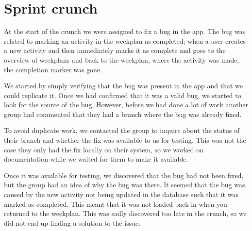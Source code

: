 \section{Sprint crunch}
At the start of the crunch we were assigned to fix a bug in the app.
The bug was related to marking an activity in the weekplan as completed; when a user creates a new activity and then immediately marks it as complete and goes to the overview of weekplans and back to the weekplan, where the activity was made, the completion marker was gone.

We started by simply verifying that the bug was present in the app and that we could replicate it.
Once we had confirmed that it was a valid bug, we started to look for the source of the bug.
However, before we had done a lot of work another group had commented that they had a branch where the bug was already fixed.

To avoid duplicate work, we contacted the group to inquire about the status of their branch and whether the fix was available to us for testing.
This was not the case they only had the fix locally on their system, so we worked on documentation while we waited for them to make it available.

Once it was available for testing, we discovered that the bug had not been fixed, but the group had an idea of why the bug was there.
It seemed that the bug was caused by the new activity not being updated in the database such that it was marked as completed.
This meant that it was not loaded back in when you returned to the weekplan.
This was sadly discovered too late in the crunch, so we did not end up finding a solution to the issue.
